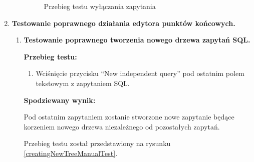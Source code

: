 \begin{enumerate}
\begin{enumerate}
\begin{figure}[h]
                    \caption{Przebieg testu wyłączania zapytania}
                    \label{blockDisablingManualTest}
                \end{figure}

                \FloatBarrier

        \end{enumerate}

    \item \textbf{Testowanie poprawnego działania edytora punktów końcowych.}

        \begin{enumerate}

            \item \textbf{Testowanie poprawnego tworzenia nowego drzewa zapytań SQL.}

                \textbf{Przebieg testu:}

                \begin{enumerate}

                    \item Wciśnięcie przycisku ``New independent query'' pod
                        ostatnim polem tekstowym z zapytaniem SQL.

                \end{enumerate}

                \textbf{Spodziewany wynik:}

                Pod ostatnim zapytaniem zostanie stworzone nowe zapytanie będące
                korzeniem nowego drzewa niezależnego od pozostałych zapytań.

                Przebieg testu został przedstawiony na rysunku \ref{creatingNewTreeManualTest}.

                \begin{figure}[h]
                    \centering



\end{figure}
\end{enumerate}
\end{enumerate}
